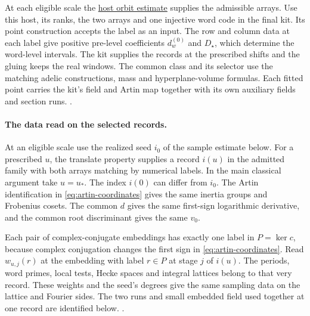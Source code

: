 At each eligible scale the
\hyperlink{proof.selection-array-windows}{host orbit estimate}
supplies the admissible arrays. Use this host, its ranks, the two arrays
and one injective word code in the final kit. Its point construction
accepts the label as an input. The row and column data at each label
give positive pre-level coefficients \(d_w^{(0)}\) and \(D_\star\),
which determine the word-level intervals. The kit supplies the records
at the prescribed shifts and the gluing keeps the real windows. The
common class and its selector use the matching adelic constructions,
mass and hyperplane-volume formulas. Each fitted point carries the kit's
field and Artin map together with its own auxiliary fields and section runs.
.

\paragraph{The data read on the selected records.}
%
At an eligible scale use the realized seed \(i_0\) of the sample
estimate below. For a prescribed \(u\),
the translate property supplies a record \(i(u)\) in the admitted family
with both arrays matching by numerical labels. In the main classical
argument take \(u=u_*\). The index \(i(0)\) can differ from \(i_0\).
The Artin identification in \eqref{eq:artin-coordinates} gives
the same inertia groups and Frobenius cosets. The common \(d\)
gives the same first-sign logarithmic derivative, and the common
root discriminant gives the same \(v_0\).

Each pair of complex-conjugate embeddings has exactly one label
in \(P=\ker c\), because complex conjugation changes the first
sign in \eqref{eq:artin-coordinates}. Read \(w_{u,j}(r)\) at the
embedding with label \(r\in P\) at stage \(j\) of \(i(u)\). The
periods, word primes, local tests, Hecke spaces and integral
lattices belong to that very record. These weights and the seed's
degrees give the same sampling data on the lattice and Fourier
sides. The two runs and small embedded field used together at one
record are identified below.
.

